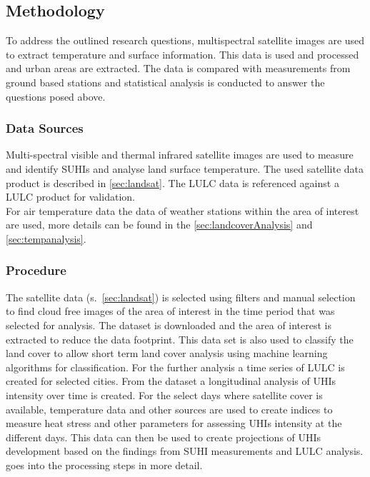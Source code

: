 \documentclass[12pt,a4paper, english,twoside]{article}
\begin{document}
 \subsection{Methodology}\label{sec:methodology}
  To address the outlined research questions, multispectral satellite images are used to extract temperature and surface information. 
  This data is used and processed and urban areas are extracted. 
  The data is compared with measurements from ground based stations and statistical analysis is conducted to answer the questions posed above.

  \subsubsection{Data Sources}\label{ssec:datasources} 
    Multi-spectral visible and thermal infrared satellite images are used to measure and identify \glspl{SUHI} and analyse land surface temperature.
    The used satellite data product is described in \cref{sec:landsat}.
    The \gls{LULC} data is referenced against a \gls{LULC} product for validation.\\ 
    For air temperature data the data of weather stations within the area of interest are used, more details can be found in the \cref{sec:landcoverAnalysis} and \cref{sec:tempanalysis}. 

  \subsubsection{Procedure}\label{ssec:procedure} 
    The satellite data (s.~\cref{sec:landsat}) is selected using filters and manual selection to find cloud free images of the area of interest in the time period that was selected for analysis. 
    The dataset is downloaded and the area of interest is extracted to reduce the data footprint.
    This data set is also used to classify the land cover to allow short term land cover analysis using machine learning algorithms for classification.
    For the further analysis a time series of \gls{LULC} is created for selected cities. 
    From the dataset a longitudinal analysis of \glspl{UHI} intensity over time is created.
    For the select days where satellite cover is available, temperature data and other sources are used to create indices to measure heat stress and other parameters for assessing \glspl{UHI} intensity at the different days.
    This data can then be used to create projections of \glspl{UHI} development based on the findings from \gls{SUHI} measurements and \gls{LULC} analysis.
     goes into the processing steps in more detail.
\end{document}
